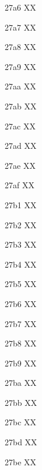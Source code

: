 \documentclass[11pt]{article}
\begin{document}
27a6 X{}X

27a7 X{}X

27a8 X{}X

27a9 X{}X

27aa X{}X

27ab X{}X

27ac X{}X

27ad X{}X

27ae X{}X

27af X{}X

27b1 X{}X

27b2 X{}X

27b3 X{}X

27b4 X{}X

27b5 X{}X

27b6 X{}X

27b7 X{}X

27b8 X{}X

27b9 X{}X

27ba X{}X

27bb X{}X

27bc X{}X

27bd X{}X

27be X{}X
\end{document}
